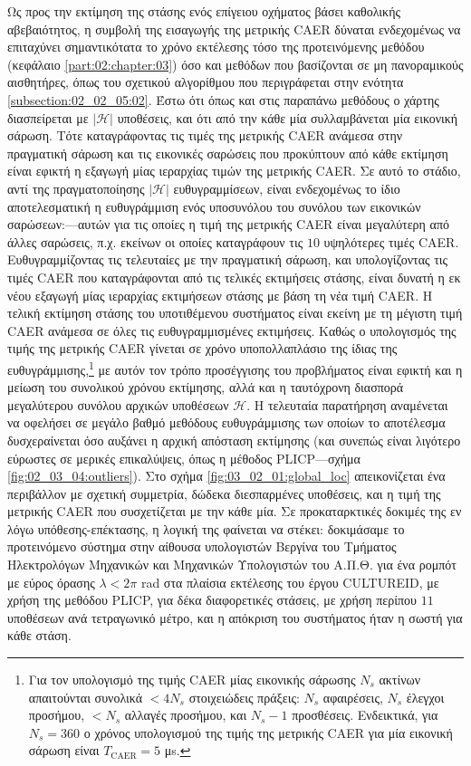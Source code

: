 Ως προς την εκτίμηση της στάσης ενός επίγειου οχήματος βάσει καθολικής
αβεβαιότητος, η συμβολή της εισαγωγής της μετρικής CAER δύναται ενδεχομένως να
επιταχύνει σημαντικότατα το χρόνο εκτέλεσης τόσο της προτεινόμενης μεθόδου
(κεφάλαιο \ref{part:02:chapter:03}) όσο και μεθόδων που βασίζονται σε μη
πανοραμικούς αισθητήρες, όπως του σχετικού αλγορίθμου που περιγράφεται στην
ενότητα \ref{subsection:02_02_05:02}. Έστω ότι όπως και στις παραπάνω μεθόδους
ο χάρτης διασπείρεται με $|\mathcal{H}|$ υποθέσεις, και ότι από την κάθε μία
συλλαμβάνεται μία εικονική σάρωση. Τότε καταγράφοντας τις τιμές της μετρικής
CAER ανάμεσα στην πραγματική σάρωση και τις εικονικές σαρώσεις που προκύπτουν
από κάθε εκτίμηση είναι εφικτή η εξαγωγή μίας ιεραρχίας τιμών της μετρικής
CAER. Σε αυτό το στάδιο, αντί της πραγματοποίησης $|\mathcal{H}|$
ευθυγραμμίσεων, είναι ενδεχομένως το ίδιο αποτελεσματική η ευθυγράμμιση ενός
υποσυνόλου του συνόλου των εικονικών σαρώσεων:---αυτών για τις οποίες η τιμή
της μετρικής CAER είναι μεγαλύτερη από άλλες σαρώσεις, π.χ. εκείνων οι οποίες
καταγράφουν τις $10$ υψηλότερες τιμές CAER.  Ευθυγραμμίζοντας τις τελευταίες με
την πραγματική σάρωση, και υπολογίζοντας τις τιμές CAER που καταγράφονται από
τις τελικές εκτιμήσεις στάσης, είναι δυνατή η εκ νέου εξαγωγή μίας ιεραρχίας
εκτιμήσεων στάσης με βάση τη νέα τιμή CAER. Η τελική εκτίμηση στάσης του
υποτιθέμενου συστήματος είναι εκείνη με τη μέγιστη τιμή CAER ανάμεσα σε όλες
τις ευθυγραμμισμένες εκτιμήσεις. Καθώς ο υπολογισμός της τιμής της μετρικής
CAER γίνεται σε χρόνο υποπολλαπλάσιο της ίδιας της ευθυγράμμισης,\footnote{Για
τον υπολογισμό της τιμής CAER μίας εικονικής σάρωσης $N_s$ ακτίνων απαιτούνται
συνολικά $<4N_s$ στοιχειώδεις πράξεις: $N_s$ αφαιρέσεις, $N_s$ έλεγχοι
προσήμου, $< N_s$ αλλαγές προσήμου, και $N_s-1$ προσθέσεις. Ενδεικτικά, για
$N_s=360$ ο χρόνος υπολογισμού της τιμής της μετρικής CAER για μία εικονική
σάρωση είναι $T_{\text{CAER}} = 5$ μs.} με αυτόν τον τρόπο προσέγγισης του
προβλήματος είναι εφικτή και η μείωση του συνολικού χρόνου εκτίμησης, αλλά και
η ταυτόχρονη διασπορά μεγαλύτερου συνόλου αρχικών υποθέσεων $\mathcal{H}$. Η
τελευταία παρατήρηση αναμένεται να οφελήσει σε μεγάλο βαθμό μεθόδους
ευθυγράμμισης των οποίων το αποτέλεσμα δυσχεραίνεται όσο αυξάνει η αρχική
απόσταση εκτίμησης (και συνεπώς είναι λιγότερο εύρωστες σε μερικές επικαλύψεις,
όπως η μέθοδος PLICP---σχήμα \ref{fig:02_03_04:outliers}).  Στο σχήμα
\ref{fig:03_02_01:global_loc} απεικονίζεται ένα περιβάλλον με σχετική
συμμετρία, δώδεκα διεσπαρμένες υποθέσεις, και η τιμή της μετρικής CAER που
συσχετίζεται με την κάθε μία. Σε προκαταρκτικές δοκιμές της εν λόγω
υπόθεσης-επέκτασης, η λογική της φαίνεται να στέκει: δοκιμάσαμε το προτεινόμενο
σύστημα στην αίθουσα υπολογιστών Βεργίνα του Τμήματος Ηλεκτρολόγων Μηχανικών
και Μηχανικών Υπολογιστών του Α.Π.Θ. για ένα ρομπότ με εύρος όρασης
$\lambda < 2\pi$ rad στα πλαίσια εκτέλεσης του έργου CULTUREID, με χρήση της
μεθόδου PLICP, για δέκα διαφορετικές στάσεις, με χρήση περίπου $11$ υποθέσεων
ανά τετραγωνικό μέτρο, και η απόκριση του συστήματος ήταν η σωστή για κάθε
στάση.

